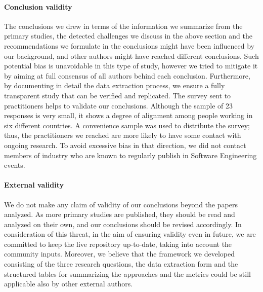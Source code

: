 \paragraph{Conclusion validity}
The conclusions we drew in terms of  the information  we summarize from the primary studies, the detected challenges we discuss in the above section and the recommendations we formulate in the conclusions might have been influenced by our background, and other authors might have reached different conclusions.
Such potential bias is unavoidable in this type of study, however we tried to mitigate it by aiming at full consensus of all authors behind each conclusion.
Furthermore, by documenting in detail the data extraction process, we ensure a fully transparent study that can be verified and replicated.
The survey sent to practitioners helps to validate our conclusions.
Although the sample of 23 responses is very small, it shows a degree of alignment among people working in six different countries.
A convenience sample was used to distribute the survey; thus, the practitioners we reached are more likely to have some contact with ongoing research.
To avoid excessive bias in that direction, we did not contact members of industry who are known to regularly publish in Software Engineering events.

\paragraph{External validity}
We do not make any claim of validity of our conclusions beyond the \numpapers papers analyzed.
As more primary studies are published, they should be read and analyzed on their own, and our conclusions should be revised accordingly. In consideration of this threat, in the aim of ensuring validity even in future, we are committed to keep the live repository up-to-date, taking into account the community inputs.
Moreover, we believe that the framework we developed consisting of the three research questions, the data extraction form and the structured tables for summarizing the approaches and the metrics could be still applicable also by other external authors.
